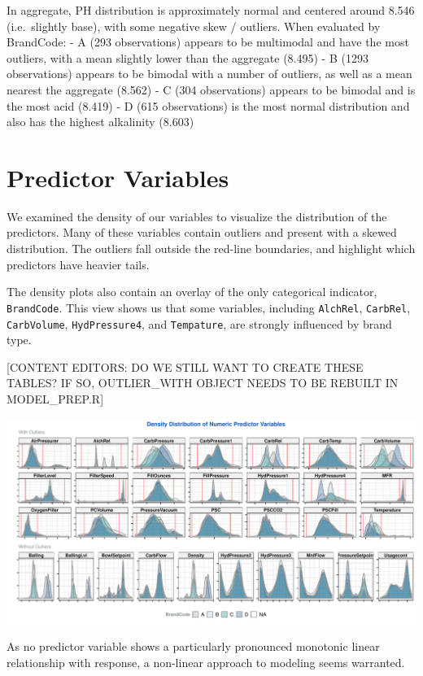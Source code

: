 \documentclass[]{report}
\begin{document}
In aggregate, PH distribution is approximately normal and centered
around 8.546 (i.e.~slightly base), with some negative skew / outliers.
When evaluated by BrandCode: - A (293 observations) appears to be
multimodal and have the most outliers, with a mean slightly lower than
the aggregate (8.495) - B (1293 observations) appears to be bimodal with
a number of outliers, as well as a mean nearest the aggregate (8.562) -
C (304 observations) appears to be bimodal and is the most acid (8.419)
- D (615 observations) is the most normal distribution and also has the
highest alkalinity (8.603)

\hypertarget{predictor-variables}{%
\section{Predictor Variables}\label{predictor-variables}}

We examined the density of our variables to visualize the distribution
of the predictors. Many of these variables contain outliers and present
with a skewed distribution. The outliers fall outside the red-line
boundaries, and highlight which predictors have heavier tails.

The density plots also contain an overlay of the only categorical
indicator, \texttt{BrandCode}. This view shows us that some variables,
including \texttt{AlchRel}, \texttt{CarbRel}, \texttt{CarbVolume},
\texttt{HydPressure4}, and \texttt{Tempature}, are strongly influenced
by brand type.

{[}CONTENT EDITORS: DO WE STILL WANT TO CREATE THESE TABLES? IF SO,
OUTLIER\_WITH OBJECT NEEDS TO BE REBUILT IN MODEL\_PREP.R{]}

\includegraphics{CONFLICT_Project_Update_files/figure-latex/unnamed-chunk-4-1.pdf}

As no predictor variable shows a particularly pronounced monotonic
linear relationship with response, a non-linear approach to modeling
seems warranted.
\end{document}
